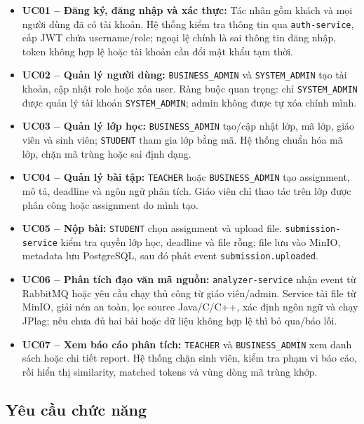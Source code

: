 \documentclass[12pt,a4paper]{article}
\begin{document}
\begin{itemize}
    \item \textbf{UC01 -- Đăng ký, đăng nhập và xác thực:} Tác nhân gồm khách và mọi người dùng đã có tài khoản. Hệ thống kiểm tra thông tin qua \texttt{auth-service}, cấp JWT chứa username/role; ngoại lệ chính là sai thông tin đăng nhập, token không hợp lệ hoặc tài khoản cần đổi mật khẩu tạm thời.
    \item \textbf{UC02 -- Quản lý người dùng:} \texttt{BUSINESS\_ADMIN} và \texttt{SYSTEM\_ADMIN} tạo tài khoản, cập nhật role hoặc xóa user. Ràng buộc quan trọng: chỉ \texttt{SYSTEM\_ADMIN} được quản lý tài khoản \texttt{SYSTEM\_ADMIN}; admin không được tự xóa chính mình.
    \item \textbf{UC03 -- Quản lý lớp học:} \texttt{BUSINESS\_ADMIN} tạo/cập nhật lớp, mã lớp, giáo viên và sinh viên; \texttt{STUDENT} tham gia lớp bằng mã. Hệ thống chuẩn hóa mã lớp, chặn mã trùng hoặc sai định dạng.
    \item \textbf{UC04 -- Quản lý bài tập:} \texttt{TEACHER} hoặc \texttt{BUSINESS\_ADMIN} tạo assignment, mô tả, deadline và ngôn ngữ phân tích. Giáo viên chỉ thao tác trên lớp được phân công hoặc assignment do mình tạo.
    \item \textbf{UC05 -- Nộp bài:} \texttt{STUDENT} chọn assignment và upload file. \texttt{submission-service} kiểm tra quyền lớp học, deadline và file rỗng; file lưu vào MinIO, metadata lưu PostgreSQL, sau đó phát event \texttt{submission.uploaded}.
    \item \textbf{UC06 -- Phân tích đạo văn mã nguồn:} \texttt{analyzer-service} nhận event từ RabbitMQ hoặc yêu cầu chạy thủ công từ giáo viên/admin. Service tải file từ MinIO, giải nén an toàn, lọc source Java/C/C++, xác định ngôn ngữ và chạy JPlag; nếu chưa đủ hai bài hoặc dữ liệu không hợp lệ thì bỏ qua/báo lỗi.
    \item \textbf{UC07 -- Xem báo cáo phân tích:} \texttt{TEACHER} và \texttt{BUSINESS\_ADMIN} xem danh sách hoặc chi tiết report. Hệ thống chặn sinh viên, kiểm tra phạm vi báo cáo, rồi hiển thị similarity, matched tokens và vùng dòng mã trùng khớp.
\end{itemize}

\subsection{Yêu cầu chức năng}
\end{document}
